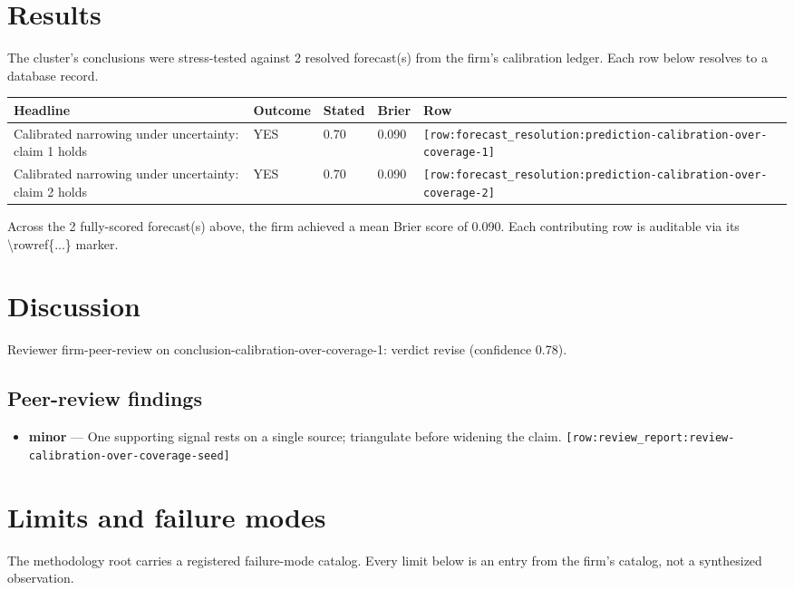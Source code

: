 \documentclass[11pt,letterpaper]{article}
\newcommand{\rowref}[1]{\texttt{\small[row:#1]}}
\begin{document}
\section{Results}
The cluster's conclusions were stress-tested against
2 resolved forecast(s) from the firm's
calibration ledger. Each row below resolves to a database record.

\begin{center}
\begin{tabular}{@{}p{} p{} p{} p{} p{}@{}}
\toprule
\textbf{Headline} & \textbf{Outcome} & \textbf{Stated} & \textbf{Brier} & \textbf{Row} \\
\midrule
Calibrated narrowing under uncertainty: claim 1 holds & YES & 0.70 & 0.090 & \rowref{forecast\_resolution:prediction-calibration-over-coverage-1} \\
Calibrated narrowing under uncertainty: claim 2 holds & YES & 0.70 & 0.090 & \rowref{forecast\_resolution:prediction-calibration-over-coverage-2} \\
\bottomrule
\end{tabular}
\end{center}

Across the 2 fully-scored forecast(s) above, the firm achieved a mean Brier score of 0.090. Each contributing row is auditable via its \textbackslash{}rowref\{...\} marker.
\section{Discussion}
Reviewer firm-peer-review on conclusion-calibration-over-coverage-1: verdict revise (confidence 0.78).
\subsection*{Peer-review findings}
\begin{itemize}[leftmargin=1.5em]
  \item \textbf{minor} --- One supporting signal rests on a single source; triangulate before widening the claim.
        \rowref{review\_report:review-calibration-over-coverage-seed}
\end{itemize}
\section{Limits and failure modes}
The methodology root carries a registered failure-mode catalog. Every
limit below is an entry from the firm's catalog, not a synthesized
observation.
\end{document}
